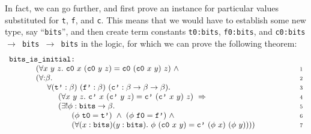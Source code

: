 In fact, we can go further, and first prove an instance for particular values
substituted for \texttt{t}, \texttt{f}, and \texttt{c}.  This means that we would
have to establish some new type, say ``\texttt{bits}'', and then create
term constants \texttt{t0:bits}, \texttt{f0:bits}, and \texttt{c0:bits $\rightarrow$
bits $\rightarrow$ bits} in the logic, for which we can prove the following theorem:
%
%
%
\[
\begin{array}[t]{l@{\hspace{2mm}}l@{\hspace{20mm}}r}
\multicolumn{3}{l}{
\mbox{\tt bits\_is\_initial:}} \\
 & \hspace{10mm}
   (\forall x\ y\ z.\ \mbox{\tt c0}\ x\ (\mbox{\tt c0}\ y\ z) =
                      \mbox{\tt c0}\ (\mbox{\tt c0}\ x\ y)\ z) \ \wedge &
\mbox{\scriptsize \textsc{1}} \\
 & \hspace{10mm}
   (\forall{:} \beta. &
\mbox{\scriptsize \textsc{2}} \\
 & \hspace{15mm}
    \forall (\mbox{\tt t'}:\beta)\ (\mbox{\tt f'}:\beta)\ 
            (\mbox{\tt c'}:\beta \rightarrow \beta \rightarrow \beta). &
\mbox{\scriptsize \textsc{3}} \\
 & \hspace{20mm}
   (\forall x\ y\ z.\ \mbox{\tt c'}\ x\ (\mbox{\tt c'}\ y\ z) =
                      \mbox{\tt c'}\ (\mbox{\tt c'}\ x\ y)\ z) \ \Rightarrow &
\mbox{\scriptsize \textsc{4}} \\
 & \hspace{20mm}
   (\exists ! \phi : \mbox{\tt bits} \rightarrow \beta. &
\mbox{\scriptsize \textsc{5}} \\
 & \hspace{26mm}
   (\phi\ \mbox{\tt t0} = \mbox{\tt t'}) \ \wedge \ 
   (\phi\ \mbox{\tt f0} = \mbox{\tt f'}) \ \wedge &
\mbox{\scriptsize \textsc{6}} \\
 & \hspace{26mm}
   (\forall (x:\mbox{\tt bits}) (y:\mbox{\tt bits}).\ \phi\ (\mbox{\tt c0}\ x\ y) =
                                    \mbox{\tt c'}\ (\phi\ x)\ (\phi\ y)))) &
\mbox{\scriptsize \textsc{7}} 
\end{array}
\]

